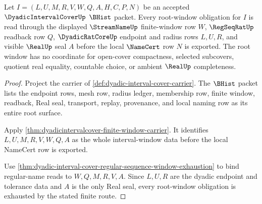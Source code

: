 \begin{theorem}
\label{thm:dyadicintervalcover-root-window-obligations}
Let $I=(L,U,M,R,V,W,Q,A,H,C,P,N)$ be an accepted $\DyadicIntervalCoverUp$ $\BHist$ packet. Every root-window obligation for $I$ is read through the displayed $\StreamNameUp$ finite-window row $W$, $\RegSeqRatUp$ readback row $Q$, $\DyadicRatCoreUp$ endpoint and radius rows $L,U,R$, and visible $\RealUp$ seal $A$ before the local $\NameCert$ row $N$ is exported. The root window has no coordinate for open-cover compactness, selected subcovers, quotient real equality, countable choice, or ambient $\RealUp$ completeness.
\end{theorem}
\begin{proof}
Project the carrier of \autoref{def:dyadic-interval-cover-carrier}. The $\BHist$ packet lists the endpoint rows, mesh row, radius ledger, membership row, finite window, readback, Real seal, transport, replay, provenance, and local naming row as its entire root surface.

Apply \autoref{thm:dyadicintervalcover-finite-window-carrier}. It identifies $L,U,M,R,V,W,Q,A$ as the whole interval-window data before the local NameCert row is exported.

Use \autoref{thm:dyadic-interval-cover-regular-sequence-window-exhaustion} to bind regular-name reads to $W,Q,M,R,V,A$. Since $L,U,R$ are the dyadic endpoint and tolerance data and $A$ is the only Real seal, every root-window obligation is exhausted by the stated finite route.
\end{proof}

